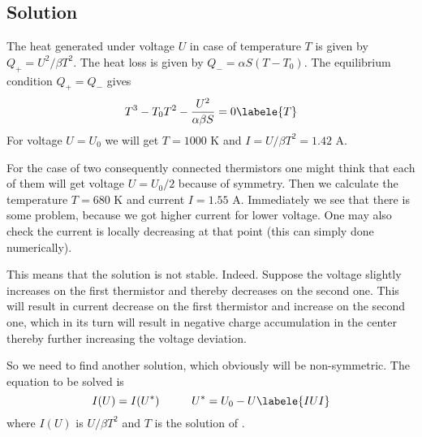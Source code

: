 \subsection*{Solution}

The heat generated under voltage $U$ in case of temperature $T$
is given by $Q_+ = U^2 / \beta T^2$.
The heat loss is given by $Q_- = \alpha S (T - T_0)$.
The equilibrium condition $Q_+ = Q_-$ gives
\begin{equation}
    T^3 - T_0 T^2 - \frac{U^2}{\alpha \beta S} = 0
    \labele{T}
\end{equation}
For voltage $U = U_0$ we will get
$T = 1000 \text{ K}$ and $I = U / \beta T^2 = 1.42 \text{ A}$.

For the case of two consequently connected thermistors
one might think that each of them will get voltage $U = U_0 / 2$
because of symmetry.
Then we calculate the temperature $T = 680 \text{ K}$ and
current $I = 1.55 \text{ A}$.
Immediately we see that there is some problem,
because we got higher current for lower voltage.
One may also check the current is locally decreasing at that point
(this can simply done numerically).

This means that the solution is not stable. Indeed.
Suppose the voltage slightly increases on the first thermistor
and thereby decreases on the second one.
This will result in current decrease on the first thermistor
and increase on the second one,
which in its turn will result in negative charge accumulation in the center
thereby further increasing the voltage deviation.

So we need to find another solution,
which obviously will be non-symmetric.
The equation to be solved is
\begin{equation}
    I(U) = I(U^*) \hspace{1cm} U^* = U_0 - U
    \labele{IUI}
\end{equation}
where $I(U)$ is $U / \beta T^2$ and $T$ is the solution of .

